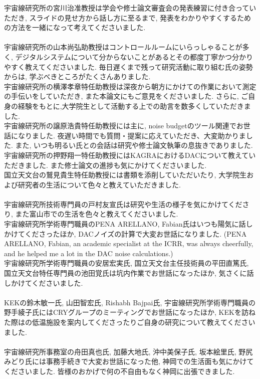 \quad 宇宙線研究所の宮川治准教授は学会や修士論文審査会の発表練習に付き合っていただき, スライドの見せ方から話し方に至るまで, 発表をわかりやすくするための方法を一緒になって考えてくださいました.   \\\\
\quad 宇宙線研究所の山本尚弘助教授はコントロールルームにいらっしゃることが多く, デジタルシステムについて分からないことがあるとその都度丁寧かつ分かりやすく教えてくださいました. 毎日遅くまで残って研究活動に取り組む氏の姿勢からは, 学ぶべきところがたくさんありました. \\
\quad 宇宙線研究所の横澤孝章特任助教授は深夜から朝方にかけての作業において測定の手伝いをしていただき, また本論文にもご意見をくださいました. さらに, ご自身の経験をもとに,大学院生として活動する上での助言を数多くしていただきました. \\
\quad 宇宙線研究所の譲原浩貴特任助教授には主に, noise budgetのツール関連でお世話になりました. 夜遅い時間でも質問・提案に応えていただき、大変助かりました. また, いつも明るい氏との会話は研究や修士論文執筆の息抜きでありました.\\
\quad 宇宙線研究所の押野翔一特任助教授にはKAGRAにおけるDACについて教えていただきました. また修士論文の進捗も気にかけてくださいました.\\
\quad 国立天文台の鷲見貴生特任助教授には書類を添削していただいたり, 大学院生および研究者の生活について色々と教えていただきました.\\\\
\quad 宇宙線研究所技術専門員の戸村友宣氏は研究や生活の様子を気にかけてくださり, また富山市での生活を色々と教えてくださいました.\\
\quad 宇宙線研究所学術専門職員のPENA ARELLANO, Fabian氏はいつも陽気に話しかけてくださったほか, DACノイズの計算で大変お世話になりました. (PENA ARELLANO, Fabian, an academic specialist at the ICRR, was always cheerfully, and he helped me a lot in the DAC noise calculations.)\\
\quad 宇宙線研究所学術専門職員の安居宏実氏, 国立天文台主任技術員の平田直篤氏, 国立天文台特任専門員の池田覚氏は坑内作業でお世話になったほか, 気さくに話しかけてくださいました.\\\\
\quad KEKの鈴木敏一氏, 山田智宏氏, Rishabh Bajpai氏, 宇宙線研究所学術専門職員の野手綾子氏にはCRYグループのミーティングでお世話になったほか, KEKを訪ねた際はの低温施設を案内してくださったりご自身の研究について教えてくださいました.\\\\
\quad 宇宙線研究所事務室の舟田真也氏, 加藤大地氏, 沖中美保子氏, 坂本絵里氏, 野尻みどり氏には事務手続きで大変お世話になった他, 神岡での生活面も気にかけてくださいました. 皆様のおかげで何の不自由もなく神岡に出張できました. \\
